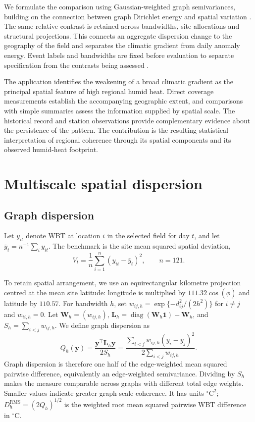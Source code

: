 \documentclass[namedate,webpdf,modern,mediumone]{oup-authoring-template}
\begin{document}
We formulate the comparison using Gaussian-weighted graph semivariances,
building on the connection between graph Dirichlet energy and spatial
variation \citep{cressie1993,shuman2013,dong2016}. The same relative contrast
is retained across bandwidths, site allocations and structural projections.
This connects an aggregate dispersion change to the geography of the field
and separates the climatic gradient from daily anomaly energy. Event labels
and bandwidths are fixed before evaluation to separate specification from
the contrasts being assessed \citep{simmons2011,white2000}.

The application identifies the weakening of a broad climatic gradient as the
principal spatial feature of high regional humid heat. Direct coverage
measurements establish the accompanying geographic extent, and comparisons
with simple summaries assess the information supplied by spatial scale.
The historical record and station observations provide complementary evidence
about the persistence of the pattern. The contribution is the resulting
statistical interpretation of regional coherence through its spatial
components and its observed humid-heat footprint.

\section{Multiscale spatial dispersion}

\subsection{Graph dispersion}

Let $y_{it}$ denote WBT at location $i$ in the selected field for day $t$, and
let $\bar y_t=n^{-1}\sum_i y_{it}$. The benchmark is the site mean
squared spatial deviation,
\begin{equation}
  V_t=\frac{1}{n}\sum_{i=1}^{n}(y_{it}-\bar y_t)^2,
  \qquad n=121.
  \label{eq:variance}
\end{equation}

To retain spatial arrangement, we use an equirectangular kilometre projection
centred at the mean site latitude: longitude is multiplied by
$111.32\cos(\bar\phi)$ and latitude by $110.57$. For
bandwidth $h$, set $w_{ij,h}=\exp\{-d_{ij}^2/(2h^2)\}$ for $i\ne j$ and
$w_{ii,h}=0$. Let $\mathbf W_h=(w_{ij,h})$,
$\mathbf L_h=\operatorname{diag}(\mathbf W_h\mathbf 1)-\mathbf W_h$, and
$S_h=\sum_{i<j}w_{ij,h}$. We define graph dispersion as
\begin{equation}
  Q_h(\mathbf y)=\frac{\mathbf y^\top\mathbf L_h\mathbf y}{2S_h}
  =\frac{\sum_{i<j}w_{ij,h}(y_i-y_j)^2}{2\sum_{i<j}w_{ij,h}}.
  \label{eq:graph-dispersion}
\end{equation}
Graph dispersion is therefore one half of the edge-weighted mean squared
pairwise difference, equivalently an edge-weighted semivariance. Dividing by
$S_h$ makes the measure comparable across graphs with
different total edge weights. Smaller values indicate greater graph-scale
coherence. It has units $^\circ\mathrm C^2$;
$D_h^{\mathrm{RMS}}=(2Q_h)^{1/2}$ is the weighted root mean squared pairwise
WBT difference in $^\circ\mathrm C$.
\end{document}
